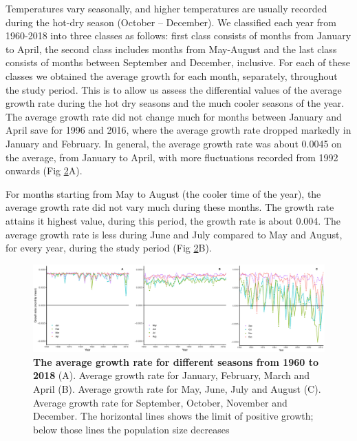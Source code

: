 \documentclass[10pt,a4paper]{article}
\begin{document}
Temperatures vary seasonally, and higher temperatures are usually recorded during the hot-dry season (October – December). We classified each year from 1960-2018 into three classes as follows: first class consists of months from January to April, the second class includes months from May-August and the last class consists of months between September and December, inclusive. For each of these classes we obtained the average growth for each month, separately, throughout the study period. This is to allow us assess the differential values of the average growth rate during the hot dry seasons and the much cooler seasons of the year. The average growth rate did not change much for months between January and April save for 1996 and 2016, where the average growth rate dropped markedly in January and February. In general, the average growth rate was about 0.0045 on the average, from January to April, with more fluctuations recorded from 1992 onwards (Fig \ref{fig:tsetseflowchat2}A).\\     





\begin{figure}[h]
	\centering
	\label{fig:tsetseflowchat1}
\end{figure}

For months starting from May to August (the cooler time of the year),  the average growth rate did not vary much during these months. The growth rate attains it highest value, during this period, the growth rate is about 0.004. The average growth rate is less during  June and July compared to May and August, for every year, during the study period  (Fig \ref{fig:tsetseflowchat2}B).  



\begin{figure}[h]
	\centering
	\includegraphics[width=1.05\linewidth]{MonthlyGrowthRateDec12}
	\caption{ {\bf The average growth rate for different seasons from 1960 to 2018} (A). Average growth rate for January, February, March and April (B). Average growth rate for May, June, July and August (C). Average growth rate for September, October, November and December. The horizontal lines shows the limit of positive growth; below those lines the population size decreases}
	\label{fig:tsetseflowchat2}
\end{figure}
\end{document}
